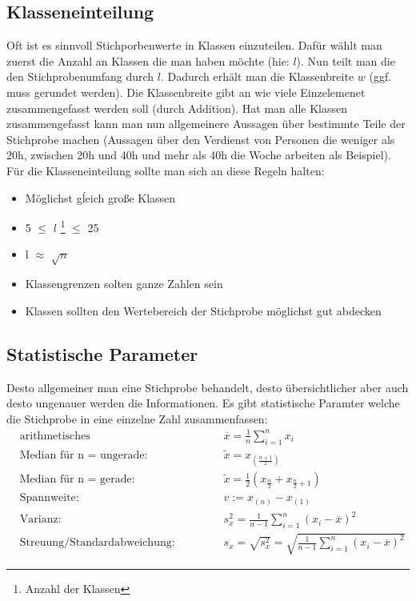 \documentclass[a4paper]{scrartcl}
\begin{document}
        \subsection{Klasseneinteilung}
            Oft ist es sinnvoll Stichporbenwerte in Klassen einzuteilen. Dafür wählt man zuerst die Anzahl an Klassen die man haben möchte (hie: \(l\)). Nun teilt man die
            den Stichprobenumfang durch \(l\). Dadurch erhält man die Klassenbreite \(w\) (ggf. muss gerundet werden). Die Klassenbreite gibt an wie viele Einzelemenet zusammengefasst werden
            soll (durch Addition). Hat man alle Klassen zusammengefasst kann man nun allgemeinere Aussagen über bestimmte Teile der Stichprobe machen (Aussagen über den Verdienst von 
            Personen die weniger als 20h, zwischen 20h und 40h und mehr als 40h die Woche arbeiten als Beispiel). \\
            Für die Klasseneinteilung sollte man sich an diese Regeln halten: 
            \begin{itemize}
                \item Möglichst gĺeich große Klassen
                \item 5 \(\le\) \(l\) \footnote{Anzahl der Klassen} \(\le\) 25
                \item l \(\approx\) \(\sqrt{n}\)
                \item Klassengrenzen solten ganze Zahlen sein 
                \item Klassen sollten den Wertebereich der Stichprobe möglichst gut abdecken
            \end{itemize}  
        \subsection{Statistische Parameter}
            Desto allgemeiner man eine Stichprobe behandelt, desto übersichtlicher  aber auch desto ungenauer werden die Informationen.
            Es gibt statistische Paramter welche die Stichprobe in eine einzelne Zahl zusammenfassen: 
            \begin{equation*}
                \begin{aligned}
                    & \text{arithmetisches Mittel/Stichprobenmitte: } & \overline{x} = \frac{1}{n} \sum_{i=1}^n x_i \\
                    & \text{Median für n = ungerade:} & \tilde{x} =  x_{(\frac{n+1}{2})}  \\
                    & \text{Median für n = gerade: } & \tilde{x} = \frac{1}{2} (x_{\frac{n}{2}} + x_{\frac{n}{2} + 1}) \\
                    & \text{Spannweite: } & v := x_{(n)} - x_{(1)} \\
                    & \text{Varianz: } & s_x^2 = \frac{1}{n - 1} \sum_{i=1}^n(x_i - \overline{x})^2 \\
                    & \text{Streuung/Standardabweichung: } & s_x = \sqrt{s_x^2} = \sqrt{\frac{1}{n - 1} \sum_{i=1}^n(x_i - \overline{x})^2 }  
                \end{aligned}
            \end{equation*}
\end{document}
